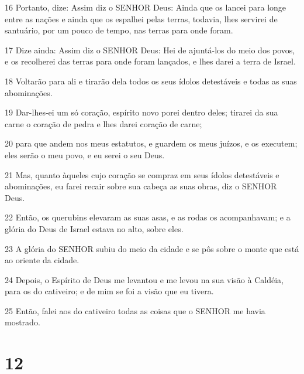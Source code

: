 \par 16 Portanto, dize: Assim diz o SENHOR Deus: Ainda que os lancei para longe entre as nações e ainda que os espalhei pelas terras, todavia, lhes servirei de santuário, por um pouco de tempo, nas terras para onde foram.
\par 17 Dize ainda: Assim diz o SENHOR Deus: Hei de ajuntá-los do meio dos povos, e os recolherei das terras para onde foram lançados, e lhes darei a terra de Israel.
\par 18 Voltarão para ali e tirarão dela todos os seus ídolos detestáveis e todas as suas abominações.
\par 19 Dar-lhes-ei um só coração, espírito novo porei dentro deles; tirarei da sua carne o coração de pedra e lhes darei coração de carne;
\par 20 para que andem nos meus estatutos, e guardem os meus juízos, e os executem; eles serão o meu povo, e eu serei o seu Deus.
\par 21 Mas, quanto àqueles cujo coração se compraz em seus ídolos detestáveis e abominações, eu farei recair sobre sua cabeça as suas obras, diz o SENHOR Deus.
\par 22 Então, os querubins elevaram as suas asas, e as rodas os acompanhavam; e a glória do Deus de Israel estava no alto, sobre eles.
\par 23 A glória do SENHOR subiu do meio da cidade e se pôs sobre o monte que está ao oriente da cidade.
\par 24 Depois, o Espírito de Deus me levantou e me levou na sua visão à Caldéia, para os do cativeiro; e de mim se foi a visão que eu tivera.
\par 25 Então, falei aos do cativeiro todas as coisas que o SENHOR me havia mostrado.

\chapter{12}


